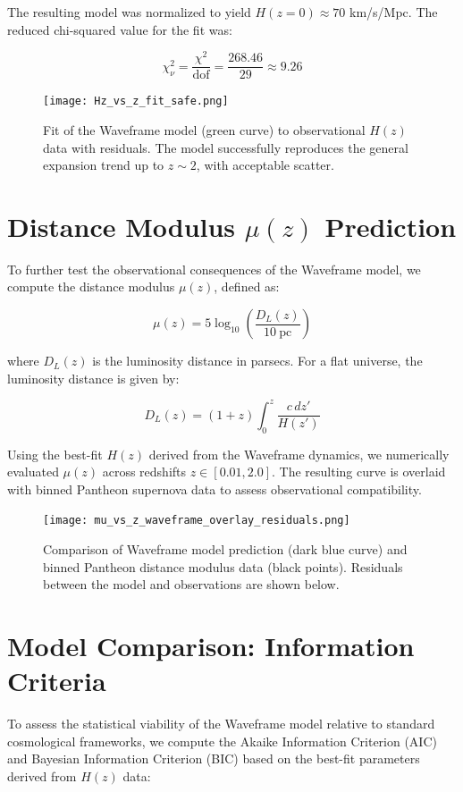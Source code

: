 \documentclass[12pt]{article}
\begin{document}
The resulting model was normalized to yield $H(z=0) \approx 70$ km/s/Mpc. The reduced chi-squared value for the fit was:

\[
\chi^2_\nu = \frac{\chi^2}{\text{dof}} = \frac{268.46}{29} \approx 9.26
\]

\begin{figure}[h!]
\centering
\texttt{[image: Hz\_vs\_z\_fit\_safe.png]}
\caption{Fit of the Waveframe model (green curve) to observational $H(z)$ data with residuals. The model successfully reproduces the general expansion trend up to $z \sim 2$, with acceptable scatter.}
\end{figure}



\section*{Distance Modulus $\mu(z)$ Prediction}

To further test the observational consequences of the Waveframe model, we compute the distance modulus $\mu(z)$, defined as:

\[
\mu(z) = 5 \log_{10} \left( \frac{D_L(z)}{10\ \text{pc}} \right)
\]

where $D_L(z)$ is the luminosity distance in parsecs. For a flat universe, the luminosity distance is given by:

\[
D_L(z) = (1+z) \int_0^z \frac{c\,dz'}{H(z')}
\]

Using the best-fit $H(z)$ derived from the Waveframe dynamics, we numerically evaluated $\mu(z)$ across redshifts $z \in [0.01, 2.0]$. The resulting curve is overlaid with binned Pantheon supernova data to assess observational compatibility.

\begin{figure}[h!]
\centering
\texttt{[image: mu\_vs\_z\_waveframe\_overlay\_residuals.png]}
\caption{Comparison of Waveframe model prediction (dark blue curve) and binned Pantheon distance modulus data (black points). Residuals between the model and observations are shown below.}
\end{figure}


\section*{Model Comparison: Information Criteria}

To assess the statistical viability of the Waveframe model relative to standard cosmological frameworks, we compute the Akaike Information Criterion (AIC) and Bayesian Information Criterion (BIC) based on the best-fit parameters derived from $H(z)$ data:
\end{document}
